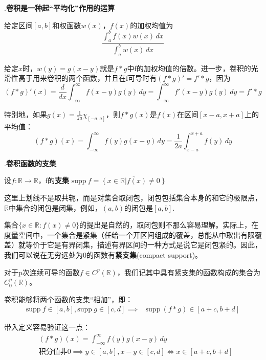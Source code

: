.\textbf{卷积是一种起“平均化”作用的运算}
\begin{definition}[加权均值]
    给定区间$[a,b]$和权函数$w(x)$，$f(x)$的加权均值为\[\frac{\int_{a}^{b}f(x)w(x)\,dx}{\int_{a}^{b}w(x)\,dx}\]
\end{definition}
给定$x$时，$w(y)=g(x-y)$就是$f*g$中f的加权均值的倍数。进一步，卷积的光滑性高于用来卷积的两个函数，并且在f可导时有$(f*g)'=f'*g$，因为
\[(f*g)'(x)=\frac{d}{dx}\int_{-\infty}^{\infty}f(x-y)g(y)\,dy=\int_{-\infty}^{\infty}f'(x-y)g(y)\,dy=f'*g\]

特别地，如果$g(x)=\frac{1}{2a}\chi_{[-a,a]}$，则$f*g(x)$是$f(x)$在区间$[x-a,x+a]$上的平均值：
\[(f*g)(x)=\int_{-\infty}^{\infty}f(y)g(x-y)\,dy=\frac{1}{2a}\int_{x-a}^{x+a}f(y)\,dy\]

.\textbf{卷积函数的支集}

\begin{definition}[支集]
    设$f:\mathbb{R}\to \mathbb{R}$，f的\textbf{支集}
$\text{supp}\ f=\overline{\left\{x\in\mathbb{R}\left|f(x)\neq 0\right.\right\}}$
\end{definition}

这里上划线不是取共轭，而是对集合取闭包，闭包包括集合本身的和它的极限点，$\mathbb{R}$中集合的闭包是闭集，例如，$(a,b)$的闭包是$[a,b]$.

集合$\{x\in\mathbb{R}:f(x)\neq 0\}$的提出是自然的，取闭包则不那么容易理解。实际上，在度量空间中，一个集合是紧集（任给一个开区间组成的覆盖，总能从中取出有限覆盖）就等价于它是有界闭集，描述有界区间的一种方式是说它是闭包紧的。因此，我们可以说在无穷远处为0的函数有\textbf{紧支集}(compact support)。
\begin{definition}[紧支函数空间]
对于p次连续可导的函数$f\in C^p(\mathbb{R})$，我们记其中具有紧支集的函数构成的集合为$C_0^p(\mathbb{R})$。
\end{definition}

\begin{proposition}
    卷积能够将两个函数的支集“相加”，即：\begin{align*}
    \text{supp}\ f\in [a,b],\text{supp}\ g\in [c,d]\implies&\text{supp}\ (f*g)\in [a+c,b+d]
    \end{align*}
\end{proposition}

带入定义容易验证这一点：
\begin{align*}
     & (f*g)(x) =\int_{-\infty}^{\infty}f(y)g(x-y)\,dy                               \\
     & \text{积分值非0}\implies y\in [a,b],x-y\in [c,d]\iff x\in [a+c,b+d]
\end{align*}

